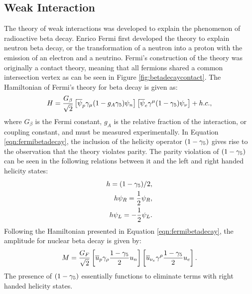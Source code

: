 \subsection{Weak Interaction}
\label{sec:weak}
The theory of weak interactions was developed to explain the phenomenon of radioactive beta decay.
Enrico Fermi first developed the theory to explain neutron beta decay, or the transformation of a neutron into a proton with the emission of an electron  and a neutrino.
Fermi's construction of the theory was originally a contact theory, meaning that all fermions shared a common intersection vertex as can be seen in Figure \ref{fig:betadecaycontact}.
The Hamiltonian of Fermi's theory for beta decay is given as:
\begin{equation}
\label{eqn:fermibetadecay}
H = \frac{G_{\beta}}{\sqrt{2}}\left[\overline{\psi}_{p}\gamma_{\mu}(1- g_{A}\gamma_{5})\psi_{n}\right]\left[\overline{\psi}_{e}\gamma^{\mu}(1-\gamma_{5})\psi_{\nu}\right] + h.c.,
\end{equation}
where $G_{\beta}$ is the Fermi constant, $g_{A}$ is the relative fraction of the interaction, or coupling constant, and must be measured experimentally.
In Equation \ref{eqn:fermibetadecay}, the inclusion of the helicity operator $(1-\gamma_{5})$ gives rise to the observation that the theory violates parity. 
The parity violation of $(1-\gamma_{5})$  can be seen in the following relations between it and the left and right handed helicity states:
\begin{equation}
\begin{split}
h = (1-\gamma_{5})/2, \\
h\psi_{R} = \frac{1}{2}\psi_{R}, \\
h\psi_{L} = -\frac{1}{2}\psi_{L}. 
\end{split}
\end{equation}
Following the Hamiltonian presented in Equation \ref{eqn:fermibetadecay}, the amplitude for nuclear beta decay is given by:
\begin{equation}
M = \frac{G_{F}}{\sqrt{2}}\left[\overline{u}_{p}\gamma_{\rho}\frac{1-\gamma_{5}}{2}u_{n}\right] \left[\overline{u}_{\nu_{e}}\gamma^{\rho}\frac{1-\gamma_{5}}{2}u_{e}\right].
\end{equation}
The presence of $(1-\gamma_{5})$ essentially functions to eliminate terms with right handed helicity states.
